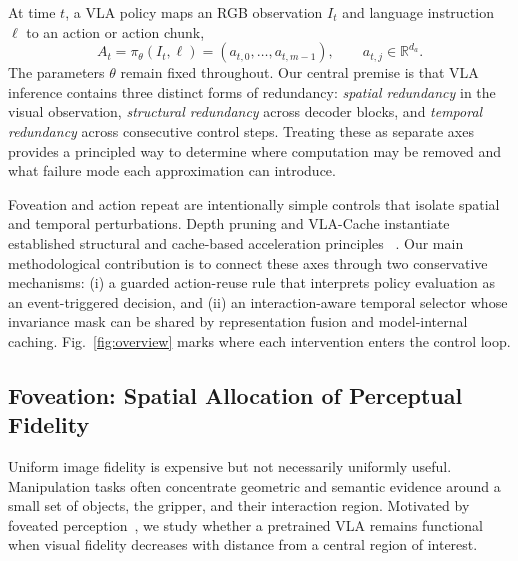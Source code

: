 \documentclass[letterpaper, 10 pt, conference]{ieeeconf}
\begin{document}
At time $t$, a VLA policy maps an RGB observation $I_t$ and language instruction
$\ell$ to an action or action chunk,
\begin{equation}
    A_t=\pi_\theta(I_t,\ell)
       =(a_{t,0},\ldots,a_{t,m-1}),
    \qquad a_{t,j}\in\mathbb{R}^{d_a}.
    \label{eq:vla_formulation}
\end{equation}
The parameters $\theta$ remain fixed throughout. Our central premise is that
VLA inference contains three distinct forms of redundancy: \emph{spatial
redundancy} in the visual observation, \emph{structural redundancy} across
decoder blocks, and \emph{temporal redundancy} across consecutive control
steps. Treating these as separate axes provides a principled way to determine
where computation may be removed and what failure mode each approximation can
introduce.

Foveation and action repeat are intentionally simple controls that isolate
spatial and temporal perturbations. Depth pruning and VLA-Cache instantiate
established structural and cache-based acceleration principles
~\cite{shortgpt,efficientvla,vlacache}. Our main methodological contribution is
to connect these axes through two conservative mechanisms: (i) a guarded
action-reuse rule that interprets policy evaluation as an event-triggered
decision, and (ii) an interaction-aware temporal selector whose invariance mask
can be shared by representation fusion and model-internal caching.
Fig.~\ref{fig:overview} marks where each intervention enters the control loop.

\subsection{Foveation: Spatial Allocation of Perceptual Fidelity}
\label{sec:method_foveation}

Uniform image fidelity is expensive but not necessarily uniformly useful.
Manipulation tasks often concentrate geometric and semantic evidence around a
small set of objects, the gripper, and their interaction region. Motivated by
foveated perception~\cite{schwartz,traver}, we study whether a pretrained VLA
remains functional when visual fidelity decreases with distance from a central
region of interest.
\end{document}
